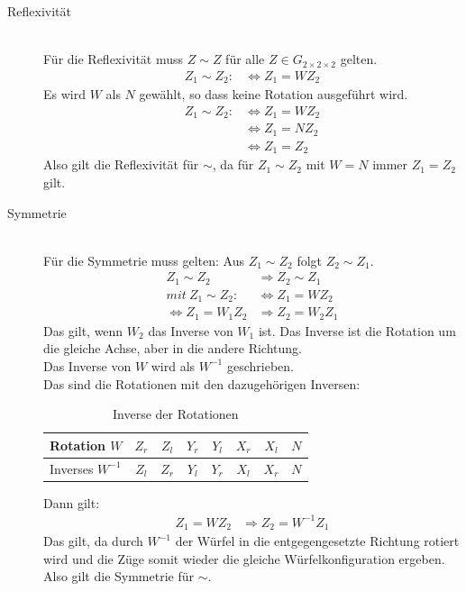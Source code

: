 \documentclass[12pt,a4paper, usenames, dvipsnames]{article}
\newcommand{\Gtwo}{\ensuremath{G_{2\times 2\times 2}}}
\begin{document}
\begin{description}



\item [Reflexivität] \ \\
Für die Reflexivität muss $Z \sim Z$ für alle $Z \in \Gtwo$ gelten. 
\begin{align*}
Z_1 \sim Z_2 : & \Leftrightarrow  Z_1 = WZ_2
\end{align*}
Es wird $W$ als $N$ gewählt, so dass keine Rotation ausgeführt wird.
\begin{align*}
Z_1 \sim Z_2 : & \Leftrightarrow  Z_1 = WZ_2 \\
\ & \Leftrightarrow Z_1=N Z_2 \\
\ & \Leftrightarrow Z_1 = Z_2
\end{align*}
Also gilt die Reflexivität für $\sim$, da für $Z_1 \sim Z_2$ mit $W=N$ immer $Z_1 = Z_2$ gilt.

\item [Symmetrie] \ \\
Für die Symmetrie muss gelten: Aus $Z_1 \sim Z_2$ folgt $Z_2 \sim Z_1$.
\begin{align*}
Z_1 \sim Z_2 & \Rightarrow Z_2 \sim Z_1 \\
mit \ Z_1 \sim Z_2 : & \Leftrightarrow  Z_1 = WZ_2 \\
\Leftrightarrow Z_1 = W_1 Z_2 & \Rightarrow Z_2 = W_2 Z_1
\end{align*}
Das gilt, wenn $W_2$ das Inverse von $W_1$ ist. Das Inverse ist die Rotation um die gleiche Achse, aber in die andere Richtung. \\
Das Inverse von $W$ wird als $W^{-1}$ geschrieben. \\

Das sind die Rotationen mit den dazugehörigen Inversen: \\

\begin{table}[H]
\centering
\begin{tabular}{|l||c|c|c|c|c|c|c|}
\hline
Rotation $W$ & ${Z_r}$ & ${Z_l}$ &  ${Y_r}$ & ${Y_l}$ & ${X_r}$ & ${X_l}$ & $N$ \\
\hline
Inverses $W^{-1}$ & ${Z_l}$ & ${Z_r}$ &  ${Y_l}$ & ${Y_r}$ & ${X_l}$ & ${X_r}$ & $N$ \\
\hline
\end{tabular} 
\caption[Inverse der Rotationen]{Inverse der Rotationen}
\end{table}

Dann gilt: 
\begin{align*}
Z_1 = W Z_2 & \Rightarrow Z_2 = W^{-1} Z_1
\end{align*}
Das gilt, da durch $W^{-1}$ der Würfel in die entgegengesetzte Richtung rotiert wird und die Züge somit wieder die gleiche Würfelkonfiguration ergeben. \\
Also gilt die Symmetrie für $\sim$.



\end{description}
\end{document}
